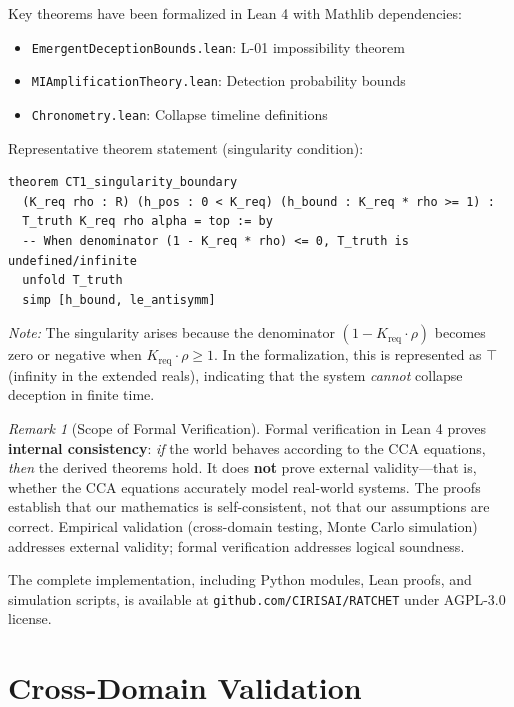 \documentclass[11pt,a4paper]{article}
\theoremstyle{definition}
\theoremstyle{remark}
\newtheorem{remark}{Remark}[section]
\newcommand{\Kreq}{K_{\text{req}}}
\begin{document}
Key theorems have been formalized in Lean 4 with Mathlib dependencies:

\begin{itemize}[noitemsep]
    \item \texttt{EmergentDeceptionBounds.lean}: L-01 impossibility theorem
    \item \texttt{MIAmplificationTheory.lean}: Detection probability bounds
    \item \texttt{Chronometry.lean}: Collapse timeline definitions
\end{itemize}

Representative theorem statement (singularity condition):
\begin{verbatim}
theorem CT1_singularity_boundary
  (K_req rho : R) (h_pos : 0 < K_req) (h_bound : K_req * rho >= 1) :
  T_truth K_req rho alpha = top := by
  -- When denominator (1 - K_req * rho) <= 0, T_truth is undefined/infinite
  unfold T_truth
  simp [h_bound, le_antisymm]
\end{verbatim}

\noindent\textit{Note:} The singularity arises because the denominator $(1 - \Kreq \cdot \rho)$ becomes zero or negative when $\Kreq \cdot \rho \geq 1$. In the formalization, this is represented as $\top$ (infinity in the extended reals), indicating that the system \textit{cannot} collapse deception in finite time.

\begin{remark}[Scope of Formal Verification]
Formal verification in Lean 4 proves \textbf{internal consistency}: \textit{if} the world behaves according to the CCA equations, \textit{then} the derived theorems hold. It does \textbf{not} prove external validity---that is, whether the CCA equations accurately model real-world systems. The proofs establish that our mathematics is self-consistent, not that our assumptions are correct. Empirical validation (cross-domain testing, Monte Carlo simulation) addresses external validity; formal verification addresses logical soundness.
\end{remark}

The complete implementation, including Python modules, Lean proofs, and simulation scripts, is available at \texttt{github.com/CIRISAI/RATCHET} under AGPL-3.0 license.

\section{Cross-Domain Validation}
\label{sec:cross-domain}
\end{document}
